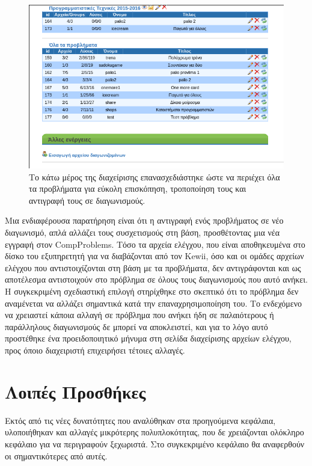 \documentclass[diploma]{softlab-thesis}
\begin{document}
\begin{figure}
  \centering
  \includegraphics[scale=0.5,trim=4 4 4 4,clip]{Figures/aftersepall.png}
  \caption[Εμφάνιση όλων των προβλημάτων]{Το κάτω μέρος της διαχείρισης
  επανασχεδιάστηκε ώστε να περιέχει όλα τα προβλήματα για εύκολη επισκόπηση,
  τροποποίηση τους και αντιγραφή τους σε διαγωνισμούς.}
\end{figure}

\bigskip

Μια ενδιαφέρουσα παρατήρηση είναι ότι η αντιγραφή ενός προβλήματος σε νέο
διαγωνισμό, απλά αλλάζει τους συσχετισμούς στη βάση, προσθέτοντας μια νέα
εγγραφή στον CompProblems. Τόσο τα αρχεία ελέγχου, που είναι αποθηκευμένα στο
δίσκο του εξυπηρετητή για να διαβάζονται από τον Kewii, όσο και οι ομάδες
αρχείων ελέγχου που αντιστοιχίζονται στη βάση με τα προβλήματα, δεν
αντιγράφονται και ως αποτέλεσμα αντιστοιχούν στο πρόβλημα σε όλους τους
διαγωνισμούς που αυτό ανήκει. Η συγκεκριμένη σχεδιαστική επιλογή στηρίχθηκε στο
σκεπτικό ότι το πρόβλημα δεν αναμένεται να αλλάζει σημαντικά κατά την
επαναχρησιμοποίηση του. Το ενδεχόμενο να χρειαστεί κάποια αλλαγή σε πρόβλημα
που ανήκει ήδη σε παλαιότερους ή παράλληλους διαγωνισμούς δε μπορεί να
αποκλειστεί, και για το λόγο αυτό προστέθηκε ένα προειδοποιητικό μήνυμα στη
σελίδα διαχείρισης αρχείων ελέγχου, προς όποιο διαχειριστή επιχειρήσει τέτοιες
αλλαγές.


\chapter{Λοιπές Προσθήκες}

Εκτός από τις νέες δυνατότητες που αναλύθηκαν στα προηγούμενα κεφάλαια,
υλοποιήθηκαν και αλλαγές μικρότερης πολυπλοκότητας, που δε χρειάζονται
ολόκληρο κεφάλαιο για να περιγραφούν ξεχωριστά. Στο συγκεκριμένο κεφάλαιο θα
αναφερθούν οι σημαντικότερες από αυτές.
\end{document}
